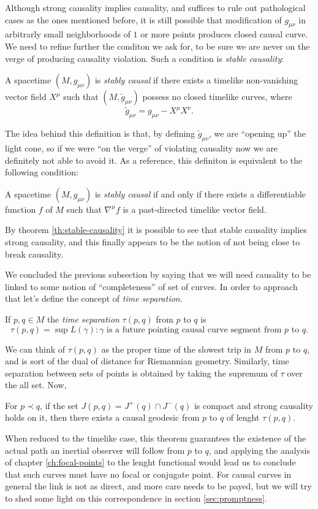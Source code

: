 	Although strong causality implies causality, and suffices to rule out pathological cases as the ones mentioned before, it is still possible that modification of \(g_{\mu\nu}\) in arbitrarly small neighborhoods of \(1\) or more points produces closed causal curve. We need to refine further the conditon we ask for, to be sure we are never on the verge of producing causality violation. Such a condition is \emph{stable causality}:
	\begin{definition}
		A spacetime \((M, g_{\mu\nu})\) is \emph{stably causal} if there exists a timelike non-vanishing vector field \(X^{\mu}\) such that \((M, \tilde{g}_{\mu\nu})\) possess no closed timelike curves, where
		\[
			\tilde{g}_{\mu\nu}= g_{\mu\nu} - X^{\mu}X^{\nu}.
		\]
	\end{definition}
	The idea behind this definition is that, by defining \(\tilde{g}_{\mu\nu}\), we are ``opening up'' the light cone, so if we were ``on the verge'' of violating causality now we are definitely not able to avoid it. As a reference, this definiton is equivalent to the following condition:
	\begin{theorem}
		\label{th:stable-causality}
		A spacetime \((M, g_{\mu\nu})\) is \emph{stably causal} if and only if there exists a differentiable function \(f\) of \(M\) such that \(\nabla^{\mu}f\) is a past-directed timelike vector field.
	\end{theorem}
By theorem \ref{th:stable-causality} it is possible to see that stable causality implies strong causality, and this finally appears to be the notion of not being close to break causality.

We concluded the previous subsection by saying that we will need causality to be linked to some notion of ``completeness'' of set of curves. In order to approach that let's define the concept of \emph{time separation}.
\begin{definition}
	If \(p,q\in M\) the \emph{time separation} \(\tau (p,q)\) from \(p\) to \(q\) is
	\[
		\tau (p,q) = \sup{L(\gamma): \gamma\text{ is a future pointing causal curve segment from } p \text{ to } q}.
	\]
\end{definition}
We can think of \(\tau (p,q)\) as the proper time of the slowest trip in \(M\) from \(p\) to \(q\), and is sort of the dual of distance for Riemannian geometry.
Similarly, time separation between sets of points is obtained by taking the supremum of \(\tau\) over the all set. Now,
\begin{prop}
	\label{prop:global-existence}
	For \(p \prec q\), if the set \(J(p, q) = J^+(q) \cap J^-(q)\) is compact and strong causality holds on it, then there exists a causal geodesic from \(p\) to \(q\) of lenght \(\tau (p,q)\).
\end{prop}
When reduced to the timelike case, this theorem guarantees the existence of the actual path an inertial observer will follow from \(p\) to \(q\), and applying the analysis of chapter \ref{ch:focal-points} to the lenght functional would lead us to conclude that such curves must have no focal or conjugate point. For causal curves in general the link is not as direct, and more care needs to be payed, but we will try to shed some light on this correspondence in section \ref{sec:promptness}.

